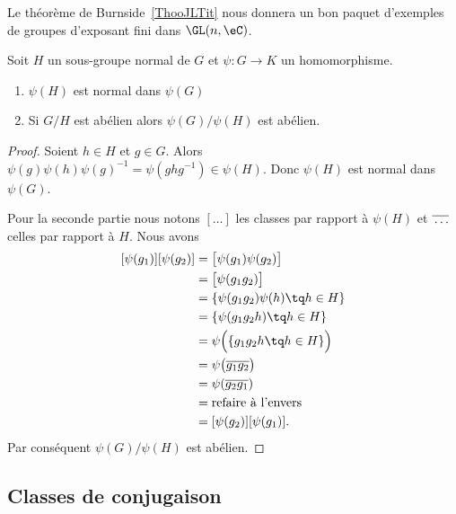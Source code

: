 Le théorème de Burnside~\ref{ThooJLTit} nous donnera un bon paquet d'exemples de groupes d'exposant fini dans \( \GL(n,\eC)\).

\begin{proposition} \label{PropSRMJooIDPBoW}
    Soit \( H\) un sous-groupe normal de \( G\) et \( \psi\colon G\to K\) un homomorphisme.
    \begin{enumerate}
        \item
            \( \psi(H)\) est normal dans \( \psi(G)\)
        \item
            Si \( G/H\) est abélien alors \( \psi(G)/\psi(H)\) est abélien.
    \end{enumerate}
\end{proposition}

\begin{proof}
    Soient \( h\in H\) et \( g\in G\). Alors \( \psi(g)\psi(h)\psi(g)^{-1}=\psi(ghg^{-1})\in\psi(H)\). Donc \( \psi(H)\) est normal dans \( \psi(G)\).

    Pour la seconde partie nous notons \( [\ldots]\) les classes par rapport à \( \psi(H)\) et \( \overline{ \vphantom{g}\ldots }\) celles par rapport à \( H\). Nous avons
    \begin{subequations}
        \begin{align}
            [\psi(g_1)][\psi(g_2)]&=\big[ \psi(g_1)\psi(g_2) \big]\\
            &=\big[ \psi(g_1g_2) \big]\\
            &=\{ \psi(g_1g_2)\psi(h)\tq h\in H \}\\
            &=\{ \psi(g_1g_2h)\tq h\in H \}\\
            &=\psi\Big(  \{ g_1g_2h\tq h\in H \}  \Big) \\
            &=\psi\big( \overline{ g_1g_2 } \big)\\
            &=\psi(\overline{ g_2g_1 })\\
            &=\text{refaire à l'envers}\\
            &=[\psi(g_2)][\psi(g_1)].
        \end{align}
    \end{subequations}
    Par conséquent \( \psi(G)/\psi(H)\) est abélien.
\end{proof}

\subsection{Classes de conjugaison}

